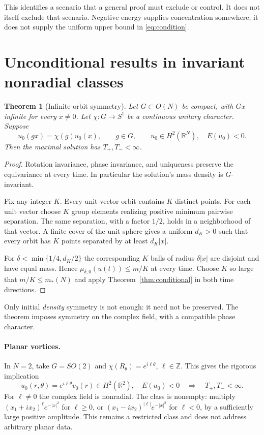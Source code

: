 \documentclass[11pt,a4paper]{article}
\newtheorem{theorem}{Theorem}[section]
\theoremstyle{remark}\newtheorem{remark}[theorem]{Remark}
\newcommand{\R}{\mathbb R}
\begin{document}
This identifies a scenario that a general proof must exclude or control. It does not itself exclude that scenario. Negative energy supplies concentration somewhere; it does not supply the uniform upper bound in \eqref{eq:condition}.

\section{Unconditional results in invariant nonradial classes}
\begin{theorem}[Infinite-orbit symmetry]\label{thm:group}
Let $G\subset O(N)$ be compact, with $Gx$ infinite for every $x\ne0$. Let $\chi:G\to S^1$ be a continuous unitary character. Suppose
\[
 u_0(gx)=\chi(g)u_0(x),\qquad g\in G,\qquad u_0\in H^2(\R^N),\quad E(u_0)<0.
\]
Then the maximal solution has $T_+,T_-<\infty$.
\end{theorem}
\begin{proof}
Rotation invariance, phase invariance, and uniqueness preserve the equivariance at every time. In particular the solution's mass density is $G$-invariant.

Fix any integer $K$. Every unit-vector orbit contains $K$ distinct points. For each unit vector choose $K$ group elements realizing positive minimum pairwise separation. The same separation, with a factor $1/2$, holds in a neighborhood of that vector. A finite cover of the unit sphere gives a uniform $d_K>0$ such that every orbit has $K$ points separated by at least $d_K|x|$.

For $\delta<\min\{1/4,d_K/2\}$ the corresponding $K$ balls of radius $\delta|x|$ are disjoint and have equal mass. Hence $\mu_{\delta,0}(u(t))\le m/K$ at every time. Choose $K$ so large that $m/K\le m_*(N)$ and apply Theorem~\ref{thm:conditional} in both time directions.
\end{proof}

Only initial \emph{density} symmetry is not enough: it need not be preserved. The theorem imposes symmetry on the complex field, with a compatible phase character.

\paragraph{Planar vortices.}
In $N=2$, take $G=SO(2)$ and $\chi(R_\theta)=e^{i\ell\theta}$, $\ell\in\mathbb Z$. This gives the rigorous implication
\[
 u_0(r,\theta)=e^{i\ell\theta}v_0(r)\in H^2(\R^2),\quad E(u_0)<0
 \quad\Longrightarrow\quad T_+,T_-<\infty.
\]
For $\ell\ne0$ the complex field is nonradial. The class is nonempty: multiply
$(x_1+ix_2)^\ell e^{-|x|^2}$ for $\ell\ge0$, or $(x_1-ix_2)^{|\ell|}e^{-|x|^2}$ for $\ell<0$, by a sufficiently large positive amplitude. This remains a restricted class and does not address arbitrary planar data.
\end{document}
